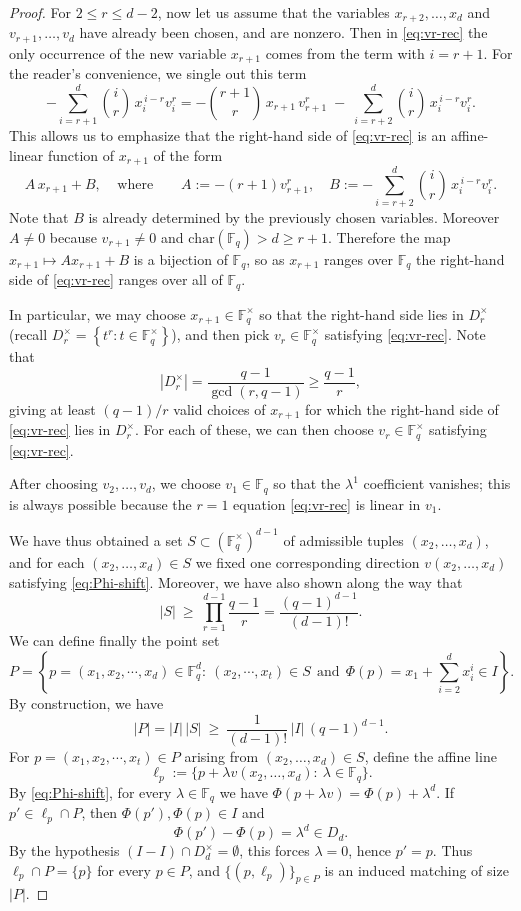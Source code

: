 \documentclass[12pt,reqno]{amsart}
\theoremstyle{plain}
\theoremstyle{definition}
\newcommand{\F}{\mathbb{F}}
\newcommand{\1}{\mathbf{1}}
\newcommand{\abs}[1]{\left|#1\right|}
\begin{document}
\begin{proof}
For $2\le r\le d-2$, now let us assume that the variables $x_{r+2},\dots,x_d$ and $v_{r+1},\dots,v_d$ have already been chosen, and are nonzero. Then in \eqref{eq:vr-rec} the only occurrence of the new variable $x_{r+1}$ comes from the term with $i=r+1$. For the reader's convenience, we single out this term
\[
-\sum_{i=r+1}^d \binom{i}{r}\,x_i^{\,i-r} v_i^r
= -\binom{r+1}{r}\,x_{r+1}\,v_{r+1}^r \;-\; \sum_{i=r+2}^d \binom{i}{r}\,x_i^{\,i-r} v_i^r.
\]
This allows us to emphasize that the right-hand side of \eqref{eq:vr-rec} is an affine-linear function of $x_{r+1}$ of the form
\[
A\,x_{r+1}+B,\ \ \ \ \ \text{where}
\qquad
A:=-(r+1)v_{r+1}^r,\quad
B:=-\sum_{i=r+2}^d \binom{i}{r}\,x_i^{\,i-r} v_i^r.
\]
Note that $B$ is already determined by the previously chosen variables.
Moreover $A\neq 0$ because $v_{r+1}\neq 0$ and $\mathrm{char}(\F_q)>d\ge r+1$.
Therefore the map $x_{r+1}\mapsto A x_{r+1}+B$ is a bijection of $\F_q$, so as $x_{r+1}$ ranges over $\F_q$
the right-hand side of \eqref{eq:vr-rec} ranges over all of $\F_q$.

In particular, we may choose $x_{r+1}\in\F_q^{\times}$ so that the right-hand side lies in $D_{r}^{\times}$ (recall $D_{r}^{\times}=\left\{t^r:t\in\F_q^\times\right\}$),
and then pick $v_r\in\F_q^\times$ satisfying \eqref{eq:vr-rec}.
Note that
$$\abs{D_r^{\times}} = \frac{q-1}{\gcd(r,q-1)} \geq \frac{q - 1}{r},$$
giving at least $(q-1)/r$ valid choices of $x_{r+1}$ for which the right-hand side
of \eqref{eq:vr-rec} lies in $D_{r}^{\times}$. For each of these, we can then choose $v_r\in\F_q^\times$ satisfying \eqref{eq:vr-rec}. 

After choosing $v_2,\dots,v_d$, we choose $v_1\in\F_q$ so that the $\lambda^1$ coefficient vanishes;
this is always possible because the $r=1$ equation \eqref{eq:vr-rec} is linear in $v_1$.

We have thus obtained a set $S\subset(\F_q^\times)^{d-1}$ of admissible tuples $(x_2,\dots,x_d)$, and for each $(x_2,\dots,x_d)\in S$ we fixed one corresponding direction $v(x_2,\dots,x_d)$ satisfying \eqref{eq:Phi-shift}. Moreover, we have also shown along the way that
$$|S|\ \ge\ \prod_{r=1}^{d-1}\frac{q-1}{r} = \frac{(q-1)^{d-1}}{(d-1)!}.$$
We can define finally the point set
$$P = \left\{p=(x_1, x_2, \cdots, x_d) \in \mathbb{F}_{q}^{d}:\ (x_2, \cdots, x_t) \in S\ \ \text{and}\ \ \Phi(p) = x_1 + \sum_{i=2}^d x_i^i \in I\right\}.$$
By construction, we have
\[
  |P|=|I|\,|S|\ \ge\ \frac{1}{(d-1)!}\,|I|\,(q-1)^{d-1}.
\]
For $p = (x_1, x_2, \cdots, x_t) \in P$ arising from $(x_2,\dots,x_d)\in S$, define the affine line
\[
  \ell_p:=\{p+\lambda v(x_2,\dots,x_d):\ \lambda\in\F_q\}.
\]
By \eqref{eq:Phi-shift}, for every $\lambda\in\F_q$ we have
$\Phi(p+\lambda v)=\Phi(p)+\lambda^d$.
If $p'\in \ell_p\cap P$, then $\Phi(p'),\Phi(p)\in I$ and
\[
  \Phi(p')-\Phi(p)=\lambda^d\in D_d.
\]
By the hypothesis $(I-I)\cap D_d^\times=\emptyset$, this forces $\lambda=0$, hence $p'=p$.
Thus $\ell_p\cap P=\{p\}$ for every $p\in P$, and $\{(p,\ell_p)\}_{p\in P}$ is an induced matching of size $|P|$.
\end{proof}
\end{document}
